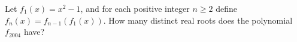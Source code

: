 Let $f_1(x)=x^2-1$, and for each positive integer $n \geq 2$ define $f_n(x) = f_{n-1}(f_1(x))$. How many distinct real roots does the polynomial $f_{2004}$ have?